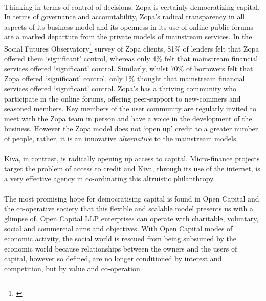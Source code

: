 \documentclass[12pt,a4paper,titlepage]{article}
\begin{document}
\paragraph{}Thinking in terms of control of decisions, Zopa is certainly democratizing capital. In terms of governance and accountability, Zopa's radical transparency in all aspects of its business model and its openness in its use of online public forums are a marked departure from the private models of mainstream services. In the Social Futures Observatory\footnote{\cite{hulme:2006sl}} survey of Zopa clients, 81\% of lenders felt that Zopa offered them ‘significant’ control, whereas only 4\% felt that mainstream financial services offered ‘significant’ control. Similarly, whilst 70\% of borrowers felt that Zopa offered ‘significant’ control, only 1\% thought that mainstream financial services offered ‘significant’ control. Zopa's has a thriving community who participate in the online forums, offering peer-support to new-commers and seasoned members. Key members of the user community are regularly invited to meet with the Zopa team in person and have a voice in the development of the business. However the Zopa model does not `open up' credit to a greater number of people, rather, it is an innovative \textit{alternative} to the mainstream models. 

\paragraph{}Kiva, in contrast, is radically opening up access to capital. Micro-finance projects target the problem of access to credit and Kiva, through its use of the internet, is a very effective agency in co-ordinating this altruistic philanthropy. 

\paragraph{}The most promising hope for democratising capital is found in Open Capital and the co-operative society that this flexible and scalable model presents us with a glimpse of. Open Capital LLP enterprises can operate with charitable, voluntary, social and commercial aims and objectives. With Open Capital modes of economic activity, the social world is rescued from being subsumed by the economic world because relationships between the owners and the users of capital, however so defined, are no longer conditioned by interest and competition, but by value and co-operation. 
\end{document}
